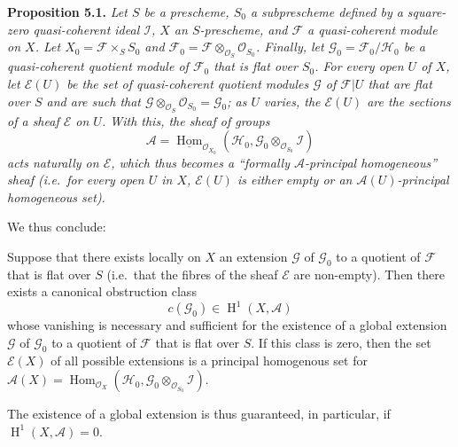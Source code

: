 \documentclass{article}
\newenvironment{itenv}[1]
  {\phantomsection\par\smallskip\noindent\textbf{#1.}\itshape}
  {\par\smallskip}
\theoremstyle{definition}
\theoremstyle{definition}
\theoremstyle{definition}
\theoremstyle{definition}
\theoremstyle{remark}
\begin{document}
\leavevmode{}%
\begin{itenv}{Proposition 5.1}
Let \(S\) be a prescheme, \(S_0\) a subprescheme defined by a square-zero quasi-coherent ideal \({\mathscr{I}}\), \(X\) an \(S\)-prescheme, and \({\mathscr{F}}\) a quasi-coherent module on \(X\).
Let \(X_0={\mathscr{F}}\times_S S_0\) and \({\mathscr{F}}_0={\mathscr{F}}\otimes_{{\mathscr{O}}_S}{\mathscr{O}}_{S_0}\).
Finally, let \({\mathscr{G}}_0={\mathscr{F}}_0/{\mathscr{H}}_0\) be a quasi-coherent quotient module of \({\mathscr{F}}_0\) that is flat over \(S_0\).
For every open \(U\) of \(X\), let \({\mathscr{E}}(U)\) be the set of quasi-coherent quotient modules \({\mathscr{G}}\) of \({\mathscr{F}}|U\) that are flat over \(S\) and are such that \({\mathscr{G}}\otimes_{{\mathscr{O}}_S}{\mathscr{O}}_{S_0}={\mathscr{G}}_0\);
as \(U\) varies, the \({\mathscr{E}}(U)\) are the sections of a sheaf \({\mathscr{E}}\) on \(U\).
With this, the sheaf of groups
\[
  {\mathscr{A}} = \underline{\operatorname{Hom}}_{{\mathscr{O}}_{X_0}}({\mathscr{H}}_0,{\mathscr{G}}_0\otimes_{{\mathscr{O}}_{S_0}}{\mathscr{I}})
\]
acts naturally on \({\mathscr{E}}\), which thus becomes a ``formally \(\mathscr{A}\)-principal homogeneous'' sheaf (i.e.~for every open \(U\) in \(X\), \({\mathscr{E}}(U)\) is either empty or an \({\mathscr{A}}(U)\)-principal homogeneous set).

\end{itenv}

We thus conclude:

\leavevmode{}%
Suppose that there exists locally on \(X\) an extension \({\mathscr{G}}\) of \({\mathscr{G}}_0\) to a quotient of \({\mathscr{F}}\) that is flat over \(S\) (i.e.~that the fibres of the sheaf \({\mathscr{E}}\) are non-empty).
Then there exists a canonical obstruction class
\[
  c({\mathscr{G}}_0) \in \operatorname{H}^1(X,{\mathscr{A}})
\]
whose vanishing is necessary and sufficient for the existence of a global extension \({\mathscr{G}}\) of \({\mathscr{G}}_0\) to a quotient of \({\mathscr{F}}\) that is flat over \(S\).
If this class is zero, then the set \({\mathscr{E}}(X)\) of all possible extensions is a principal homogenous set for \({\mathscr{A}}(X)=\operatorname{Hom}_{{\mathscr{O}}_X}({\mathscr{H}}_0,{\mathscr{G}}_0\otimes_{{\mathscr{O}}_{S_0}}{\mathscr{I}})\).

The existence of a global extension is thus guaranteed, in particular, if \(\operatorname{H}^1(X,{\mathscr{A}})=0\).
\end{document}
